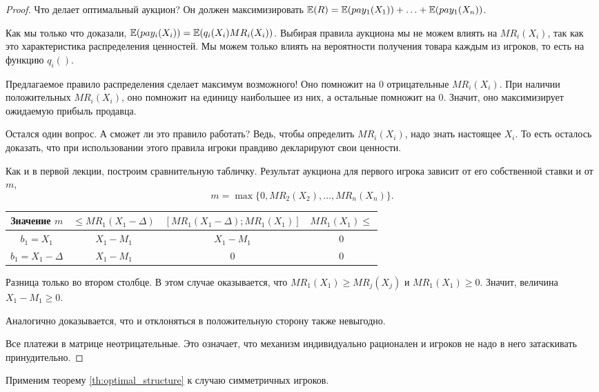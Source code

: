 \begin{proof}
Что делает оптимальный аукцион? Он должен максимизировать $ \operatorname{\mathbb{E}}(R)=\operatorname{\mathbb{E}}(pay_{1}(X_{1}))+\ldots+ \operatorname{\mathbb{E}}(pay_{1}(X_{n}))$.

Как мы только что доказали, $\operatorname{\mathbb{E}}(pay_{i}(X_{i}))=\operatorname{\mathbb{E}}(q_{i}(X_{i})MR_{i}(X_{i}))$. Выбирая правила аукциона мы не можем влиять на $ MR_{i}(X_{i}) $, так как это характеристика распределения ценностей. Мы можем только влиять на вероятности получения товара каждым из игроков, то есть на функцию $ q_{i}() $.

Предлагаемое правило распределения сделает максимум возможного! Оно помножит на 0 отрицательные $ MR_{i}(X_{i}) $. При наличии положительных $ MR_{i}(X_{i}) $, оно помножит на единицу наибольшее из них, а остальные помножит на 0. Значит, оно максимизирует ожидаемую прибыль продавца.

Остался один вопрос. А сможет ли это правило работать? Ведь, чтобы определить $ MR_{i}(X_{i}) $, надо знать настоящее $ X_{i} $. То есть осталось доказать, что при использовании этого правила игроки правдиво декларируют свои ценности.

Как и в первой лекции, построим сравнительную табличку.  Результат аукциона для первого игрока зависит от его собственной ставки и от $m$,
\[
m=\max\{0,MR_{2}(X_{2}),\ldots,MR_{n}(X_{n})\}.
\]

\begin{tabular}{cccc}
\toprule
Значение $m$ & $\leq MR_{1}(X_{1}-\Delta)$ & $ [MR_{1}(X_{1}-\Delta);MR_{1}(X_{1})] $ & $MR_{1}(X_{1})\leq $ \\
\midrule
$ b_{1}=X_{1} $ & $ X_{1}-M_{1} $ & $ X_{1}-M_{1} $ &  0\\
$b_{1}=X_{1}-\Delta $ & $ X_{1}-M_{1} $ & 0 & 0 \\
\bottomrule
\end{tabular}

Разница только во втором столбце. В этом случае оказывается, что $MR_{1}(X_{1})\geq MR_{j}(X_{j})$ и $MR_{1}(X_{1})\geq 0$. Значит, величина $ X_{1}-M_{1}\geq 0 $.

Аналогично доказывается, что и отклоняться в положительную сторону также невыгодно.

Все платежи в матрице неотрицательные. Это означает, что механизм индивидуально рационален и игроков не надо в него затаскивать принудительно.
\end{proof}

Применим теорему \ref{th:optimal_structure} к случаю симметричных игроков.

